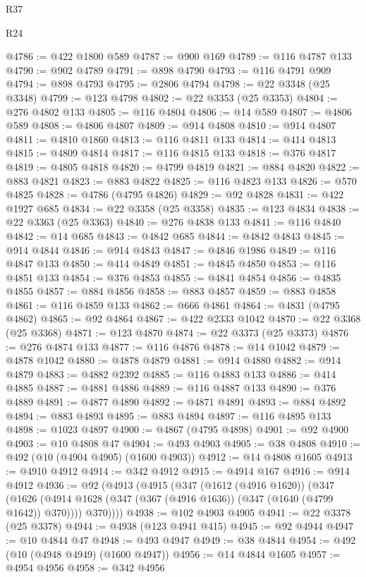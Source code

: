 \begin{lexlean}{R37}
\begin{lexlean}{R24}
\begin{coremodule}
{{{{{{{{{{{{{{{{{{{{{{{{{{{{{{{{{{{{{{{{{{{{{{{{{{{{{{{{{{{{{{{{{{{{{{{{{{{{{{{{{{{{{{{{{{{{{{{{{{{{{{{{{{{{{{{{{{{{{{{{{{{{{{{{{{{{{{{{{{{{{{{{{{{{{{{{{{{{{{{{{{{{{{{{{{{{{{{{{{{{{{{{{@4786 := @422 @1800 @589
@4787 := @900 @169
@4789 := @116 @4787 @133
@4790 := @902 @4789
@4791 := @898 @4790
@4793 := @116 @4791 @909
@4794 := @898 @4793
@4795 := @2806 @4794
@4798 := @22 @3348 (@25 @3348)
@4799 := @123 @4798
@4802 := @22 @3353 (@25 @3353)
@4804 := @276 @4802 @133
@4805 := @116 @4804
@4806 := @14 @589
@4807 := @4806 @589
@4808 := @4806 @4807
@4809 := @914 @4808
@4810 := @914 @4807
@4811 := @4810 @1860
@4813 := @116 @4811 @133
@4814 := @414 @4813
@4815 := @4809 @4814
@4817 := @116 @4815 @133
@4818 := @376 @4817
@4819 := @4805 @4818
@4820 := @4799 @4819
@4821 := @884 @4820
@4822 := @883 @4821
@4823 := @883 @4822
@4825 := @116 @4823 @133
@4826 := @570 @4825
@4828 := @4786 (@4795 @4826)
@4829 := @92 @4828
@4831 := @422 @1927 @685
@4834 := @22 @3358 (@25 @3358)
@4835 := @123 @4834
@4838 := @22 @3363 (@25 @3363)
@4840 := @276 @4838 @133
@4841 := @116 @4840
@4842 := @14 @685
@4843 := @4842 @685
@4844 := @4842 @4843
@4845 := @914 @4844
@4846 := @914 @4843
@4847 := @4846 @1986
@4849 := @116 @4847 @133
@4850 := @414 @4849
@4851 := @4845 @4850
@4853 := @116 @4851 @133
@4854 := @376 @4853
@4855 := @4841 @4854
@4856 := @4835 @4855
@4857 := @884 @4856
@4858 := @883 @4857
@4859 := @883 @4858
@4861 := @116 @4859 @133
@4862 := @666 @4861
@4864 := @4831 (@4795 @4862)
@4865 := @92 @4864
@4867 := @422 @2333 @1042
@4870 := @22 @3368 (@25 @3368)
@4871 := @123 @4870
@4874 := @22 @3373 (@25 @3373)
@4876 := @276 @4874 @133
@4877 := @116 @4876
@4878 := @14 @1042
@4879 := @4878 @1042
@4880 := @4878 @4879
@4881 := @914 @4880
@4882 := @914 @4879
@4883 := @4882 @2392
@4885 := @116 @4883 @133
@4886 := @414 @4885
@4887 := @4881 @4886
@4889 := @116 @4887 @133
@4890 := @376 @4889
@4891 := @4877 @4890
@4892 := @4871 @4891
@4893 := @884 @4892
@4894 := @883 @4893
@4895 := @883 @4894
@4897 := @116 @4895 @133
@4898 := @1023 @4897
@4900 := @4867 (@4795 @4898)
@4901 := @92 @4900
@4903 := @10 @4808 @47
@4904 := @493 @4903
@4905 := @38 @4808
@4910 := @492 (@10 (@4904 @4905) (@1600 @4903))
@4912 := @14 @4808 @1605
@4913 := @4910 @4912
@4914 := @342 @4912
@4915 := @4914 @167
@4916 := @914 @4912
@4936 := @92
    (@4913
      (@4915
        (@347
          (@1612 (@4916 @1620))
          (@347
            (@1626 (@4914 @1628 (@347 (@367 (@4916 @1636)) (@347 (@1640 (@4799 @1642)) @370))))
            @370))))
@4938 := @102 @4903 @4905
@4941 := @22 @3378 (@25 @3378)
@4944 := @4938 (@123 @4941 @415)
@4945 := @92 @4944
@4947 := @10 @4844 @47
@4948 := @493 @4947
@4949 := @38 @4844
@4954 := @492 (@10 (@4948 @4949) (@1600 @4947))
@4956 := @14 @4844 @1605
@4957 := @4954 @4956
@4958 := @342 @4956
}}}}}}}}}}}}}}}}}}}}}}}}}}}}}}}}}}}}}}}}}}}}}}}}}}}}}}}}}}}}}}}}}}}}}}}}}}}}}}}}}}}}}}}}}}}}}}}}}}}}}}}}}}}}}}}}}}}}}}}}}}}}}}}}}}}}}}}}}}}}}}}}}}}}}}}}}}}}}}}}}}}}}}}}}}}}}}}}}}}}}}}}}
\end{coremodule}
\end{lexlean}
\end{lexlean}
